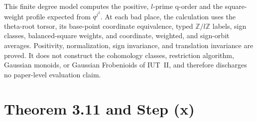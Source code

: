 \begin{definition}
  \label{def:hodge-arakelov-concrete-pilots}
  \leanok
  This finite degree model computes the positive, \(l\)-prime q-order and
  the square-weight profile expected from \(q^{j^2}\).  At each bad place,
  the calculation uses the theta-root torsor, its base-point coordinate
  equivalence, typed
  \(\mathbb Z/l\mathbb Z\) labels, sign classes, balanced-square weights, and
  coordinate, weighted, and sign-orbit averages.  Positivity, normalization,
  sign invariance, and translation invariance are proved.  It does not
  construct the cohomology classes, restriction algorithm, Gaussian monoids,
  or Gaussian Frobenioids of IUT~II, and therefore discharges no paper-level
  evaluation claim.
\end{definition}

\section{Theorem 3.11 and Step (x)}

